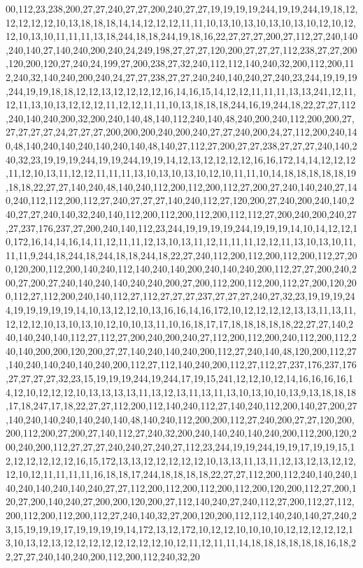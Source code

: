 00,112,23,238,200,27,27,240,27,27,200,240,27,27,19,19,19,19,244,19,19,244,19,18,12,12,12,12,12,10,13,18,18,18,14,14,12,12,12,11,11,10,13,10,13,10,13,10,13,10,12,10,12,12,10,13,10,11,11,11,13,18,244,18,18,244,19,18,16,22,27,27,27,200,27,112,27,240,140,240,140,27,140,240,200,240,24,249,198,27,27,27,120,200,27,27,27,112,238,27,27,200,120,200,120,27,240,24,199,27,200,238,27,32,240,112,112,140,240,32,200,112,200,112,240,32,140,240,200,240,24,27,27,238,27,27,240,240,140,240,27,240,23,244,19,19,19,244,19,19,18,18,12,12,13,12,12,12,12,16,14,16,15,14,12,12,11,11,11,13,13,241,12,11,12,11,13,10,13,12,12,12,11,12,12,11,11,10,13,18,18,18,244,16,19,244,18,22,27,27,112,240,140,240,200,32,200,240,140,48,140,112,240,140,48,240,200,240,112,200,200,27,27,27,27,27,24,27,27,27,200,200,200,240,200,240,27,27,240,200,24,27,112,200,240,140,48,140,240,140,240,140,240,140,48,140,27,112,27,200,27,27,238,27,27,27,240,140,240,32,23,19,19,19,244,19,19,244,19,19,14,12,13,12,12,12,12,16,16,172,14,14,12,12,12,11,12,10,13,11,12,12,11,11,11,13,10,13,10,13,10,12,10,11,11,10,14,18,18,18,18,18,19,18,18,22,27,27,140,240,48,140,240,112,200,112,200,112,27,200,27,240,140,240,27,140,240,112,112,200,112,27,240,27,27,27,140,240,112,27,120,200,27,240,200,240,140,240,27,27,240,140,32,240,140,112,200,112,200,112,200,112,112,27,200,240,200,240,27,27,237,176,237,27,200,240,140,112,23,244,19,19,19,19,244,19,19,19,14,10,14,12,12,10,172,16,14,14,16,14,11,12,11,11,12,13,10,13,11,12,11,11,11,12,12,11,13,10,13,10,11,11,11,9,244,18,244,18,244,18,18,244,18,22,27,240,112,200,112,200,112,200,112,27,200,120,200,112,200,140,240,112,140,240,140,200,240,140,240,200,112,27,27,200,240,200,27,200,27,240,140,240,140,240,240,200,27,200,112,200,112,200,112,27,200,120,200,112,27,112,200,240,140,112,27,112,27,27,27,237,27,27,27,240,27,32,23,19,19,19,244,19,19,19,19,19,14,10,13,12,12,10,13,16,16,14,16,172,10,12,12,12,12,13,13,11,13,11,12,12,12,10,13,10,13,10,12,10,10,13,11,10,16,18,17,17,18,18,18,18,18,22,27,27,140,240,140,240,140,112,27,112,27,200,240,200,240,27,112,200,112,200,240,112,200,112,240,140,200,200,120,200,27,27,140,240,140,240,200,112,27,240,140,48,120,200,112,27,140,240,140,240,140,240,200,112,27,112,140,240,200,112,27,112,27,237,176,237,176,27,27,27,27,32,23,15,19,19,19,244,19,244,17,19,15,241,12,12,10,12,14,16,16,16,16,14,12,10,12,12,12,10,13,13,13,13,11,13,12,13,11,13,11,13,10,13,10,10,13,9,13,18,18,18,17,18,247,17,18,22,27,27,112,200,112,140,240,112,27,140,240,112,200,140,27,200,27,140,240,140,240,140,240,140,48,140,240,112,200,200,112,27,240,200,27,27,120,200,200,112,200,27,200,27,140,112,27,240,32,200,240,140,240,140,240,200,112,200,120,200,240,200,112,27,27,27,240,240,27,240,27,112,23,244,19,19,244,19,19,17,19,19,15,12,12,12,12,12,12,16,15,172,13,13,12,12,12,12,12,10,13,13,11,13,11,12,13,12,13,12,12,12,10,12,11,11,11,11,16,18,18,17,244,18,18,18,18,22,27,27,112,200,112,240,140,240,140,240,140,240,140,240,27,27,112,200,112,200,112,200,112,200,120,200,112,27,200,120,27,200,140,240,27,200,200,120,200,27,112,140,240,27,240,112,27,200,112,27,112,200,112,200,112,200,112,27,240,140,32,27,200,120,200,112,112,140,240,140,27,240,23,15,19,19,19,17,19,19,19,19,14,172,13,12,172,10,12,12,10,10,10,10,12,12,12,12,12,13,10,13,12,13,12,12,12,12,12,12,12,12,10,12,11,12,11,11,14,18,18,18,18,18,18,16,18,22,27,27,240,140,240,200,112,200,112,240,32,20